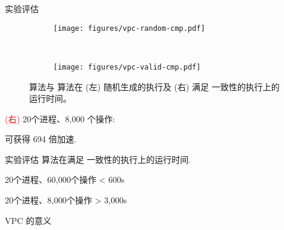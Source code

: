 \begin{frame}{实验评估}
  \begin{figure}[t]
	\centering
	\begin{subfigure}[t]{0.50\textwidth}
	  \texttt{[image: figures/vpc-random-cmp.pdf]}
	\end{subfigure}%
	~
	\begin{subfigure}[t]{0.50\textwidth}
	  \texttt{[image: figures/vpc-valid-cmp.pdf]}
	\end{subfigure}
	\caption{\rwclosure{} 算法与 \readcentric{} 算法在
	\textcolor{blue!80}{ (左) 随机生成}的执行及
	\textcolor{red!80}{ (右) 满足 \PRAM{} 一致性}的执行上的运行时间。}
  \end{figure}

  \pause
  \begin{center}
	\textcolor{red}{(右)} 20个进程、8,000 个操作: 

	\readcentric{} 可获得 694 倍加速.
  \end{center}
\end{frame}
\begin{frame}{实验评估}
  {\readcentric{} 算法在满足 \PRAM{} 一致性的执行上的运行时间.}

  \begin{description}
	\centering
	\item[\readcentric{}:] 20个进程、60,000个操作 < 600s
	\item[\rwclosure{}:] 20个进程、8,000个操作 > 3,000s
  \end{description}
\end{frame}
\begin{frame}{VPC 的意义}
\end{frame}
